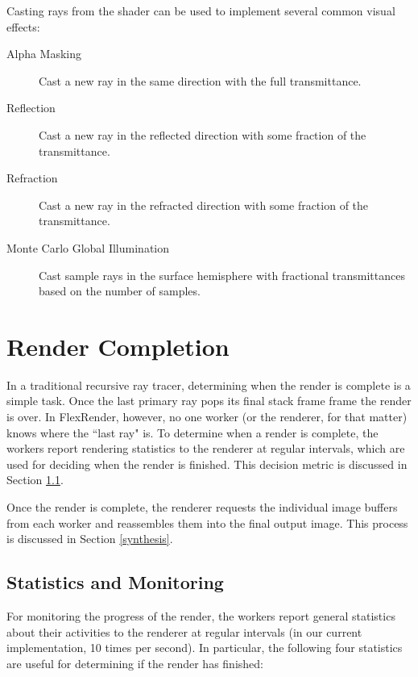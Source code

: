 \documentclass[12pt]{ucthesis}
\begin{document}
Casting rays from the shader can be used to implement several common visual
effects:

\begin{description}
    \item[Alpha Masking] Cast a new ray in the same direction with the full
        transmittance.
    \item[Reflection] Cast a new ray in the reflected direction with some
        fraction of the transmittance.
    \item[Refraction] Cast a new ray in the refracted direction with some
        fraction of the transmittance.
    \item[Monte Carlo Global Illumination] Cast sample rays in the surface
        hemisphere with fractional transmittances based on the number of samples.
\end{description}

\section{Render Completion}
\label{completion}

In a traditional recursive ray tracer, determining when the render is complete
is a simple task. Once the last primary ray pops its final stack frame frame
the render is over. In FlexRender, however, no one worker (or the renderer, for
that matter) knows where the ``last ray" is. To determine when a render is
complete, the workers report rendering statistics to the renderer at regular
intervals, which are used for deciding when the render is finished. This decision
metric is discussed in Section \ref{stats}.

Once the render is complete, the renderer requests the individual image buffers
from each worker and reassembles them into the final output image. This process
is discussed in Section \ref{synthesis}.

\subsection{Statistics and Monitoring}
\label{stats}

For monitoring the progress of the render, the workers report general statistics
about their activities to the renderer at regular intervals (in our current
implementation, 10 times per second). In particular, the following four
statistics are useful for determining if the render has finished:
\end{document}
